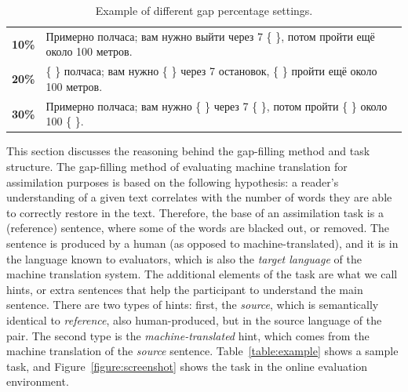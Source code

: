 \documentclass[11pt]{article}
\newcommand{\comment}[1]{\marginpar{\scriptsize\sf \textcolor{blue}{#1}}}
\newcommand{\rus}[1]{\foreignlanguage{russian}{#1}}
\begin{document}
\comment{EA: Francis, when I save cyrillic in article body, it gets replaced by ??. I committed a separate file with the table and the footnote that has the text.}

\begin{table}
  \begin{tabular}{|l|l|}
     \hline
     \textbf{10\%}   & \rus{Примерно полчаса; вам нужно выйти через 7 \{ \}, потом пройти ещё около 100 метров.} \\
     \textbf{20\%}   & \rus{\{ \} полчаса; вам нужно \{ \} через 7 остановок, \{ \} пройти ещё около 100 метров.} \\
     \textbf{30\%} & \rus{Примерно полчаса; вам нужно \{ \} через 7 \{ \}, потом пройти \{ \} около 100 \{ \}.} \\
     \hline
  \end{tabular}
  \caption{Example of different gap percentage settings.} 
  \label{table:percentage}
\end{table}


This section discusses the reasoning behind the gap-filling method and task structure. The gap-filling method 
of evaluating machine translation for assimilation purposes is based on the following hypothesis: a reader's understanding 
of a given text correlates with the number of words they are able to correctly restore in the text. Therefore, the 
base of an assimilation task is a (reference) sentence, where some of the words are blacked out, or removed. The sentence \comment{EA: I'm sorry, I'm not sure what else I could explain here...}
is produced by a human (as opposed to machine-translated), and it is in the language known to evaluators, which is also 
the \emph{target language} of the machine translation system.
The additional elements of the task are what we call hints, or extra sentences that help the participant to understand 
the main sentence. There are two types of hints: first, the \emph{source}, which is semantically identical to \emph{reference}, 
also human-produced, but in the source language of the pair. The second type is the \emph{machine-translated} hint, which 
comes from the machine translation of the \emph{source} sentence. Table~\ref{table:example} shows a sample task, and Figure~\ref{figure:screenshot} shows the task in the online evaluation environment.
\end{document}

